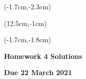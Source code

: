 \documentclass[12pt, oneside]{article}
\begin{document}
\begin{textblock*}{4cm}(-1.7cm,-2.3cm)
\end{textblock*}

\begin{textblock*}{8cm}(12.5cm,-1cm)
\end{textblock*}
\begin{textblock*}{13.5cm}(-1.7cm,-1.8cm)
\end{textblock*}

\vspace{1cm}

\begin{center}
\textbf{\Large Homework 4 Solutions}

\textbf{Due 22 March 2021}
\end{center}
\end{document}
